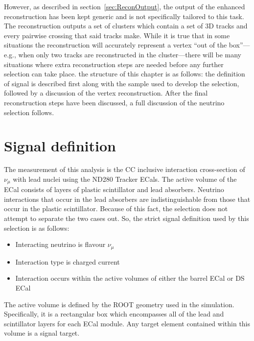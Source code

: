 \newline
However, as described in section~\ref{sec:ReconOutput}, the output of the enhanced reconstruction has been kept generic and is not specifically tailored to this task.  The reconstruction outputs a set of clusters which contain a set of 3D tracks and every pairwise crossing that said tracks make.  While it is true that in some situations the reconstruction will accurately represent a vertex ``out of the box''---e.g., when only two tracks are reconstructed in the cluster---there will be many situations where extra reconstruction steps are needed before any further selection can take place.   the structure of this chapter is as follows: the definition of signal is described first along with the sample used to develop the selection, followed by a discussion of the vertex reconstruction.  After the final reconstruction steps have been discussed, a full discussion of the neutrino selection follows.

\section{Signal definition}
\label{sec:SignalDefinition}
The measurement  of this analysis is the CC inclusive interaction cross-section of $\nu_\mu$ with lead nuclei using the ND280 Tracker ECals.  The active volume of the ECal consists of layers of plastic scintillator and lead absorbers.  Neutrino interactions that occur in the lead absorbers are indistinguishable from those that occur in the plastic scintillator.  Because of this fact, the selection does not attempt to separate the two cases out.  So, the strict signal definition used by this selection  is as follows:
\begin{itemize}
  \item Interacting neutrino is flavour $\nu_\mu$
  \item Interaction type is charged current
  \item Interaction occurs within the active volumes of either the barrel ECal or DS ECal
\end{itemize}
The active volume is defined by the ROOT geometry used in the simulation.  Specifically, it is a rectangular box which encompasses all of the lead and scintillator layers for each ECal module.  Any target element contained within this volume is a signal target.

